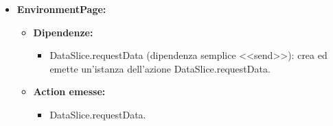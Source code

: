 \begin{itemize}
    \item \textbf{EnvironmentPage:}
          \begin{itemize}
              \item \textbf{Dipendenze:}
                    \begin{itemize}
                        \item DataSlice.requestData (dipendenza semplice <<send>>): crea ed emette un'istanza
                              dell'azione DataSlice.requestData.
                    \end{itemize}
              \item \textbf{Action emesse:}
                    \begin{itemize}
                        \item DataSlice.requestData.
                    \end{itemize}
          \end{itemize}
\end{itemize}

\pagebreak


